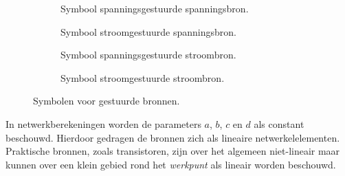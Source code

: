 \begin{figure}[!ht]
\centering
\begin{subfigure}{0.23\textwidth}
\centering
{}
\caption{Symbool spanningsgestuurde spanningsbron.}
\label{fig:gelsymbolengestuuurdebronnenen2vcvs}
\end{subfigure}
\begin{subfigure}{0.23\textwidth}
\centering
{}
\caption{Symbool stroomgestuurde spanningsbron.}
\label{fig:gelsymbolengestuuurdebronnenen2ccvs}
\end{subfigure}
\begin{subfigure}{0.23\textwidth}
\centering
{}
\caption{Symbool spanningsgestuurde stroombron.}
\label{fig:gelsymbolengestuuurdebronnenen2vccs}
\end{subfigure}
\begin{subfigure}{0.23\textwidth}
\centering
{}
\caption{Symbool stroomgestuurde stroombron.}
\label{fig:gelsymbolengestuuurdebronnenen2cccs}
\end{subfigure}
\caption{Symbolen voor gestuurde bronnen.}
\label{fig:gelsymbolengestuuurdebronnenen2}
\end{figure}

In netwerkberekeningen worden de parameters $a$, $b$, $c$ en $d$ als constant beschouwd. Hierdoor gedragen de bronnen zich als lineaire netwerkelelementen. Praktische bronnen, zoals transistoren, zijn over het algemeen niet-lineair maar kunnen over een klein gebied rond het \textsl{werkpunt} als lineair worden beschouwd.

